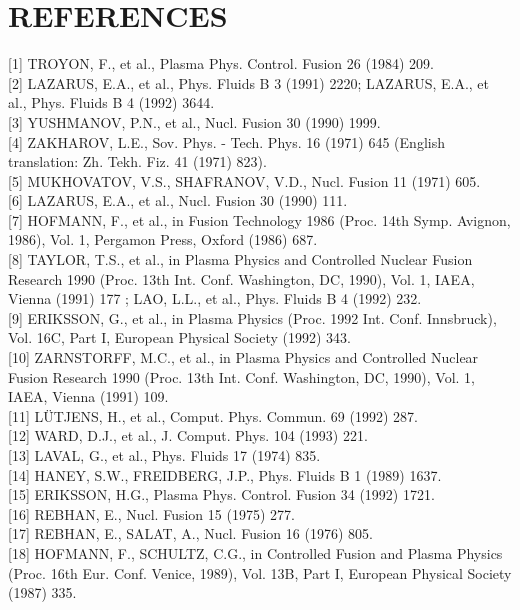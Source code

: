 \documentclass[10pt]{article}
\begin{document}
\section{REFERENCES}
[1] TROYON, F., et al., Plasma Phys. Control. Fusion 26 (1984) 209.\\[0pt]
[2] LAZARUS, E.A., et al., Phys. Fluids B 3 (1991) 2220; LAZARUS, E.A., et al., Phys. Fluids B 4 (1992) 3644.\\[0pt]
[3] YUSHMANOV, P.N., et al., Nucl. Fusion 30 (1990) 1999.\\[0pt]
[4] ZAKHAROV, L.E., Sov. Phys. - Tech. Phys. 16 (1971) 645 (English translation: Zh. Tekh. Fiz. 41 (1971) 823).\\[0pt]
[5] MUKHOVATOV, V.S., SHAFRANOV, V.D., Nucl. Fusion 11 (1971) 605.\\[0pt]
[6] LAZARUS, E.A., et al., Nucl. Fusion 30 (1990) 111.\\[0pt]
[7] HOFMANN, F., et al., in Fusion Technology 1986 (Proc. 14th Symp. Avignon, 1986), Vol. 1, Pergamon Press, Oxford (1986) 687.\\[0pt]
[8] TAYLOR, T.S., et al., in Plasma Physics and Controlled Nuclear Fusion Research 1990 (Proc. 13th Int. Conf. Washington, DC, 1990), Vol. 1, IAEA, Vienna (1991) 177 ; LAO, L.L., et al., Phys. Fluids B 4 (1992) 232.\\[0pt]
[9] ERIKSSON, G., et al., in Plasma Physics (Proc. 1992 Int. Conf. Innsbruck), Vol. 16C, Part I, European Physical Society (1992) 343.\\[0pt]
[10] ZARNSTORFF, M.C., et al., in Plasma Physics and Controlled Nuclear Fusion Research 1990 (Proc. 13th Int. Conf. Washington, DC, 1990), Vol. 1, IAEA, Vienna (1991) 109.\\[0pt]
[11] LÜTJENS, H., et al., Comput. Phys. Commun. 69 (1992) 287.\\[0pt]
[12] WARD, D.J., et al., J. Comput. Phys. 104 (1993) 221.\\[0pt]
[13] LAVAL, G., et al., Phys. Fluids 17 (1974) 835.\\[0pt]
[14] HANEY, S.W., FREIDBERG, J.P., Phys. Fluids B 1 (1989) 1637.\\[0pt]
[15] ERIKSSON, H.G., Plasma Phys. Control. Fusion 34 (1992) 1721.\\[0pt]
[16] REBHAN, E., Nucl. Fusion 15 (1975) 277.\\[0pt]
[17] REBHAN, E., SALAT, A., Nucl. Fusion 16 (1976) 805.\\[0pt]
[18] HOFMANN, F., SCHULTZ, C.G., in Controlled Fusion and Plasma Physics (Proc. 16th Eur. Conf. Venice, 1989), Vol. 13B, Part I, European Physical Society (1987) 335.\\[0pt]
\end{document}
